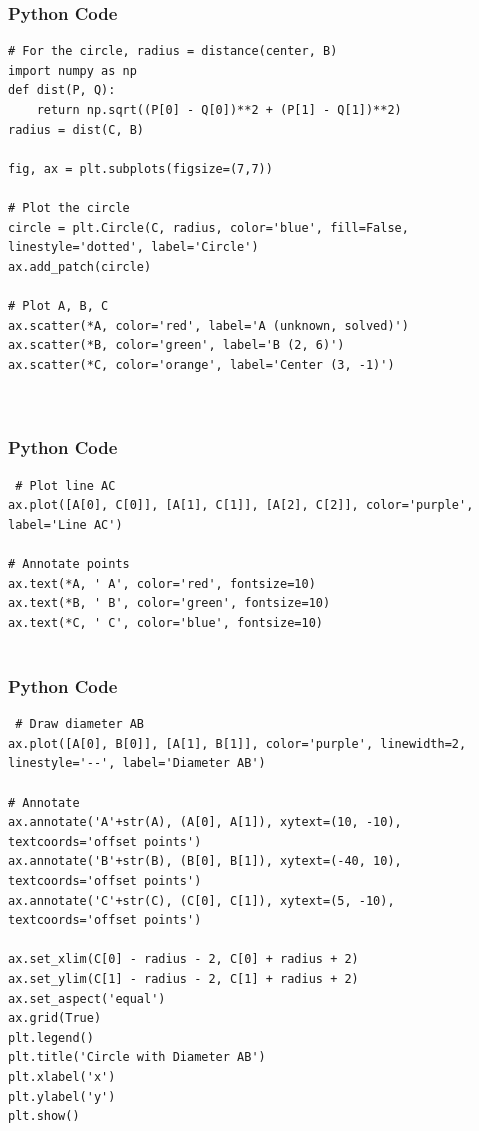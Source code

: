 \documentclass{beamer}
\begin{document}
\begin{frame}[fragile]
    \frametitle{Python Code}

    \begin{lstlisting}
# For the circle, radius = distance(center, B)
import numpy as np
def dist(P, Q):
    return np.sqrt((P[0] - Q[0])**2 + (P[1] - Q[1])**2)
radius = dist(C, B)

fig, ax = plt.subplots(figsize=(7,7))

# Plot the circle
circle = plt.Circle(C, radius, color='blue', fill=False, linestyle='dotted', label='Circle')
ax.add_patch(circle)

# Plot A, B, C
ax.scatter(*A, color='red', label='A (unknown, solved)')
ax.scatter(*B, color='green', label='B (2, 6)')
ax.scatter(*C, color='orange', label='Center (3, -1)')



    \end{lstlisting}
\end{frame}

\begin{frame}[fragile]
    \frametitle{Python Code}

    \begin{lstlisting}
 # Plot line AC
ax.plot([A[0], C[0]], [A[1], C[1]], [A[2], C[2]], color='purple', label='Line AC')

# Annotate points
ax.text(*A, ' A', color='red', fontsize=10)
ax.text(*B, ' B', color='green', fontsize=10)
ax.text(*C, ' C', color='blue', fontsize=10)


    \end{lstlisting}
\end{frame}

\begin{frame}[fragile]
    \frametitle{Python Code}

    \begin{lstlisting}
 # Draw diameter AB
ax.plot([A[0], B[0]], [A[1], B[1]], color='purple', linewidth=2, linestyle='--', label='Diameter AB')

# Annotate
ax.annotate('A'+str(A), (A[0], A[1]), xytext=(10, -10), textcoords='offset points')
ax.annotate('B'+str(B), (B[0], B[1]), xytext=(-40, 10), textcoords='offset points')
ax.annotate('C'+str(C), (C[0], C[1]), xytext=(5, -10), textcoords='offset points')

ax.set_xlim(C[0] - radius - 2, C[0] + radius + 2)
ax.set_ylim(C[1] - radius - 2, C[1] + radius + 2)
ax.set_aspect('equal')
ax.grid(True)
plt.legend()
plt.title('Circle with Diameter AB')
plt.xlabel('x')
plt.ylabel('y')
plt.show()


\end{lstlisting}
\end{frame}
\end{document}

